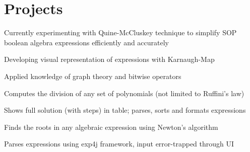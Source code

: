 \documentclass[]{deedy-resume-openfont}
\begin{document}
\begin{minipage}[t]{0.66\textwidth}

\section{Projects}

\begin{tightemize}
\item Currently experimenting with Quine-McCluskey technique to simplify SOP boolean algebra expressions efficiently and accurately\\
\item Developing visual representation of expressions with Karnaugh-Map\\
\item Applied knowledge of graph theory and bitwise operators\\
\end{tightemize}
\sectionsep

\begin{tightemize}
\item Computes the division of any set of polynomials (not limited to Ruffini's law)\\
\item Shows full solution (with steps) in table; parses, sorts and formats expressions\\
\end{tightemize}
\sectionsep


\begin{tightemize}
\item Finds the roots in any algebraic expression using Newton's algorithm\\
\item Parses expressions using exp4j framework, input error-trapped through UI\\
\end{tightemize}
\sectionsep


\end{minipage}
\end{document}
